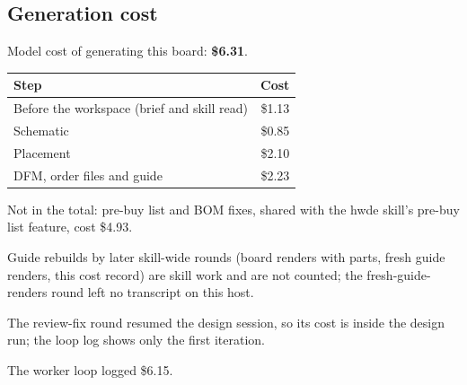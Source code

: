 \documentclass[11pt,a4paper]{article}
\begin{document}
\subsection*{Generation cost}
Model cost of generating this board: \textbf{\$6.31}.

{\small
\begin{longtable}{p{10cm}r}
\toprule
\textbf{Step} & \textbf{Cost} \\
\midrule
\endhead
Before the workspace (brief and skill read) & \$1.13 \\
Schematic & \$0.85 \\
Placement & \$2.10 \\
DFM, order files and guide & \$2.23 \\
\bottomrule
\end{longtable}
}
Not in the total: pre-buy list and BOM fixes, shared with the hwde skill's pre-buy list feature, cost \$4.93.

Guide rebuilds by later skill-wide rounds (board renders with parts, fresh guide renders, this cost record) are skill work and are not counted; the fresh-guide-renders round left no transcript on this host.

The review-fix round resumed the design session, so its cost is inside the design run; the loop log shows only the first iteration.

The worker loop logged \$6.15.
\end{document}
